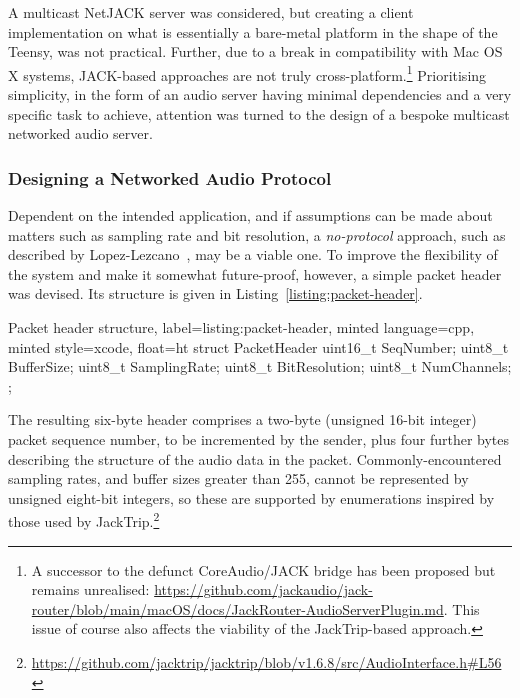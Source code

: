 \documentclass[utf8]{FrontiersinHarvard}
\newcommand{\lstref}[1]{Listing~\ref{#1}}
\begin{document}
    A multicast NetJACK server was considered, but creating a client implementation
    on what is essentially a bare-metal platform in the shape of the Teensy, was not
    practical.
    Further, due to a break in compatibility with Mac OS X systems, JACK-based
    approaches are not truly cross-platform.\footnote{
        A successor to the defunct CoreAudio/JACK bridge has been proposed but
        remains unrealised:
        \url{https://github.com/jackaudio/jack-router/blob/main/macOS/docs/JackRouter-AudioServerPlugin.md}.
        This issue of course also affects the viability of the JackTrip-based
        approach.
    }
    Prioritising simplicity, in the form of an audio server having minimal
    dependencies and a very specific task to achieve, attention was turned to the
    design of a bespoke multicast networked audio server.

    \subsubsection{Designing a Networked Audio Protocol}\label{subsubsec:designing-a-protocol}

    Dependent on the intended application, and if assumptions can be made about
    matters such as sampling rate and bit resolution, a \textit{no-protocol}
    approach, such as described by Lopez-Lezcano~\citep{lopez-lezcano_jack_2012},
    may be a viable one.
    To improve the flexibility of the system and make it somewhat future-proof,
    however, a simple packet header was devised.
    Its structure is given in \lstref{listing:packet-header}.

    \begin{codelisting}{
        Packet header structure,
        label=listing:packet-header,
        minted language=cpp,
        minted style=xcode,
        float=ht
    }
        struct PacketHeader {
            uint16_t SeqNumber;
            uint8_t BufferSize;
            uint8_t SamplingRate;
            uint8_t BitResolution;
            uint8_t NumChannels;
        };
    \end{codelisting}

    The resulting six-byte header comprises a two-byte (unsigned 16-bit integer)
    packet sequence number, to be incremented by the sender, plus four further bytes
    describing the structure of the audio data in the packet.
    Commonly-encountered sampling rates, and buffer sizes greater than 255, cannot
    be represented by unsigned eight-bit integers, so these are supported by
    enumerations inspired by those used by JackTrip.\footnote{
        \url{https://github.com/jacktrip/jacktrip/blob/v1.6.8/src/AudioInterface.h\#L56}
    }
\end{document}
